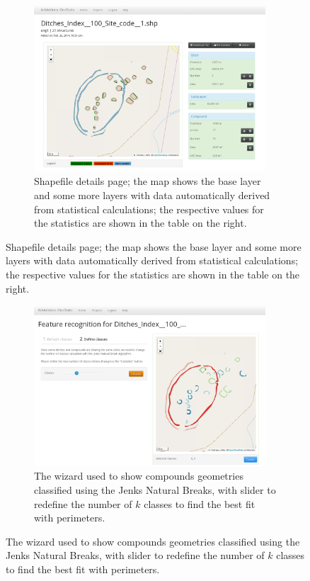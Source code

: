             \pagebreak

            \vfill

            \begin{figure}[H]
                \ContinuedFloat
                \begin{subfigure}[b]{1\textwidth}
                    \centering
                    \includegraphics[width=0.95\textwidth]{img/shp-details}
                    \caption{Shapefile details page; the map shows the base layer and some more layers with data automatically derived from statistical calculations; the respective values for the statistics are shown in the table on the right.}
                    \label{fig:shp-details}
                \end{subfigure}
            \end{figure}

            \vfill

            \begin{figure}[H]
                \ContinuedFloat
                \begin{subfigure}[b]{1\textwidth}
                    \centering
                    \includegraphics[width=0.95\textwidth]{img/shp-wizard}
                    \caption{The wizard used to show compounds geometries classified using the Jenks Natural Breaks, with slider to redefine the number of $k$ classes to find the best fit with perimeters.}
                    \label{fig:shp-wizard}
                \end{subfigure}
            \end{figure}

